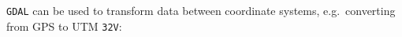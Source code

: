 \texttt{GDAL} can be used to transform data between coordinate systems, e.g.\ converting from GPS to UTM \texttt{32V}:
